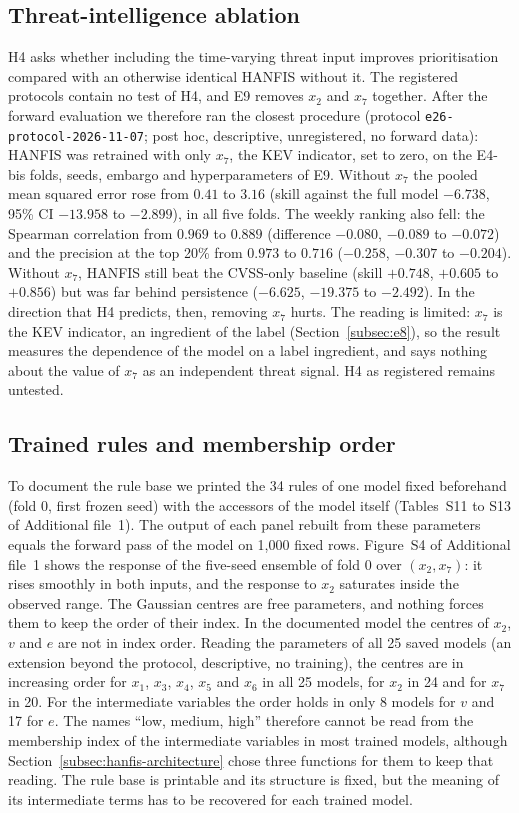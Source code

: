 \documentclass[referee,lineno,pdflatex,sn-basic]{sn-jnl}%
\theoremstyle{thmstyleone}%
\theoremstyle{thmstyletwo}%
\theoremstyle{thmstylethree}%
\begin{document}
\subsection{Threat-intelligence ablation}\label{subsec:e26}
H4 asks whether including the time-varying threat input improves prioritisation compared with an otherwise identical HANFIS without it. The registered protocols contain no test of H4, and E9 removes $x_2$ and $x_7$ together. After the forward evaluation we therefore ran the closest procedure (protocol \texttt{e26-protocol-2026-11-07}; post hoc, descriptive, unregistered, no forward data): HANFIS was retrained with only $x_7$, the KEV indicator, set to zero, on the E4-bis folds, seeds, embargo and hyperparameters of E9. Without $x_7$ the pooled mean squared error rose from $0.41$ to $3.16$ (skill against the full model $-6.738$, 95\% CI $-13.958$ to $-2.899$), in all five folds. The weekly ranking also fell: the Spearman correlation from $0.969$ to $0.889$ (difference $-0.080$, $-0.089$ to $-0.072$) and the precision at the top 20\% from $0.973$ to $0.716$ ($-0.258$, $-0.307$ to $-0.204$). Without $x_7$, HANFIS still beat the CVSS-only baseline (skill $+0.748$, $+0.605$ to $+0.856$) but was far behind persistence ($-6.625$, $-19.375$ to $-2.492$). In the direction that H4 predicts, then, removing $x_7$ hurts. The reading is limited: $x_7$ is the KEV indicator, an ingredient of the label (Section~\ref{subsec:e8}), so the result measures the dependence of the model on a label ingredient, and says nothing about the value of $x_7$ as an independent threat signal. H4 as registered remains untested.

\subsection{Trained rules and membership order}\label{subsec:e27}
To document the rule base we printed the 34 rules of one model fixed beforehand (fold 0, first frozen seed) with the accessors of the model itself (Tables~S11 to S13 of Additional file~1). The output of each panel rebuilt from these parameters equals the forward pass of the model on 1{,}000 fixed rows. Figure~S4 of Additional file~1 shows the response of the five-seed ensemble of fold 0 over $(x_2,x_7)$: it rises smoothly in both inputs, and the response to $x_2$ saturates inside the observed range. The Gaussian centres are free parameters, and nothing forces them to keep the order of their index. In the documented model the centres of $x_2$, $v$ and $e$ are not in index order. Reading the parameters of all 25 saved models (an extension beyond the protocol, descriptive, no training), the centres are in increasing order for $x_1$, $x_3$, $x_4$, $x_5$ and $x_6$ in all 25 models, for $x_2$ in 24 and for $x_7$ in 20. For the intermediate variables the order holds in only 8 models for $v$ and 17 for $e$. The names ``low, medium, high'' therefore cannot be read from the membership index of the intermediate variables in most trained models, although Section~\ref{subsec:hanfis-architecture} chose three functions for them to keep that reading. The rule base is printable and its structure is fixed, but the meaning of its intermediate terms has to be recovered for each trained model.
\end{document}
